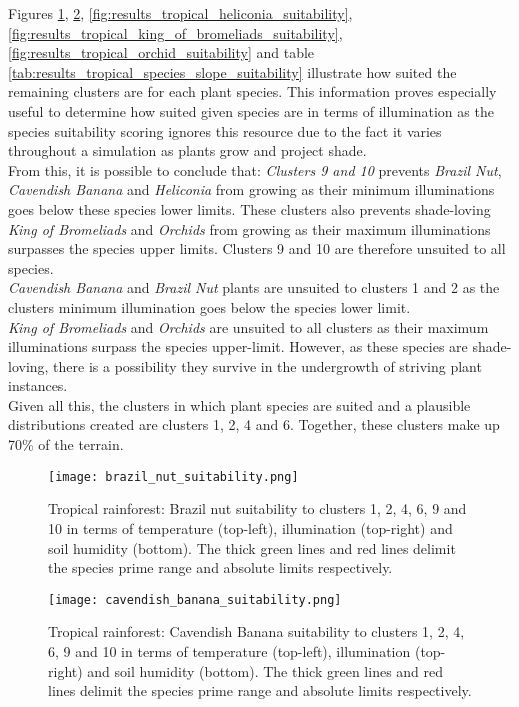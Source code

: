 Figures \ref{fig:results_tropical_brazil_nut_suitability}, \ref{fig:results_tropical_cavendish_banana_suitability}, \ref{fig:results_tropical_heliconia_suitability}, \ref{fig:results_tropical_king_of_bromeliads_suitability}, \ref{fig:results_tropical_orchid_suitability} and table \ref{tab:results_tropical_species_slope_suitability} illustrate how suited the remaining clusters are for each plant species. This information proves especially useful to determine how suited given species are in terms of illumination as the species suitability scoring ignores this resource due to the fact it varies throughout a simulation as plants grow and project shade.\\
From this, it is possible to conclude that: \textit{Clusters 9 and 10} prevents \textit{Brazil Nut}, \textit{Cavendish Banana} and \textit{Heliconia} from growing as their minimum illuminations goes below these species lower limits. These clusters also prevents shade-loving \textit{King of Bromeliads} and \textit{Orchids} from growing as their maximum illuminations surpasses the species upper limits. Clusters 9 and 10 are therefore unsuited to all species.\\
\textit{Cavendish Banana} and \textit{Brazil Nut} plants are unsuited to clusters 1 and 2 as the clusters minimum illumination goes below the species lower limit.\\
\textit{King of Bromeliads} and \textit{Orchids} are unsuited to all clusters as their maximum illuminations surpass the species upper-limit. However, as these species are shade-loving, there is a possibility they survive in the undergrowth of striving plant instances.\\
Given all this, the clusters in which plant species are suited and a plausible distributions created are clusters 1, 2, 4 and 6. Together, these clusters make up 70\% of the terrain.\\

\begin{figure}
\center
	\texttt{[image: brazil\_nut\_suitability.png]}
	\caption{ Tropical rainforest: Brazil nut suitability to clusters 1, 2, 4, 6, 9 and 10 in terms of temperature (top-left), illumination (top-right) and soil humidity (bottom). The thick green lines and red lines delimit the species prime range and absolute limits respectively. }
	\label{fig:results_tropical_brazil_nut_suitability}
\end{figure}

\begin{figure}
\center
	\texttt{[image: cavendish\_banana\_suitability.png]}
	\caption{ Tropical rainforest: Cavendish Banana suitability to clusters 1, 2, 4, 6, 9 and 10 in terms of temperature (top-left), illumination (top-right) and soil humidity (bottom). The thick green lines and red lines delimit the species prime range and absolute limits respectively.}
	\label{fig:results_tropical_cavendish_banana_suitability}
\end{figure}


